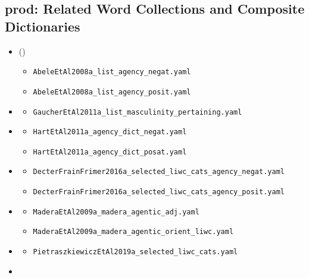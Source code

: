 \documentclass[a4paper,10pt,onecolumn,oneside,openright]{article}
\begin{document}
\subsection{prod: Related Word Collections and Composite Dictionaries}
\label{sec:orga2064ee}
\begin{itemize}
\item \textcite{AbeleEtAl2008a} (\cite{AbeleEtAl2008d})
\begin{itemize}
\item \texttt{AbeleEtAl2008a\_list\_agency\_negat.yaml}
\item \texttt{AbeleEtAl2008a\_list\_agency\_posit.yaml}
\end{itemize}
\item \textcite{GaucherEtAl2011a}
\begin{itemize}
\item \texttt{GaucherEtAl2011a\_list\_masculinity\_pertaining.yaml}
\end{itemize}
\item \textcite{HartEtAl2011a}
\begin{itemize}
\item \texttt{HartEtAl2011a\_agency\_dict\_negat.yaml}
\item \texttt{HartEtAl2011a\_agency\_dict\_posat.yaml}
\end{itemize}
\item \textcite{Decter-FrainFrimer2016a}
\begin{itemize}
\item \texttt{DecterFrainFrimer2016a\_selected\_liwc\_cats\_agency\_negat.yaml}
\item \texttt{DecterFrainFrimer2016a\_selected\_liwc\_cats\_agency\_posit.yaml}
\end{itemize}
\item \textcite{MaderaEtAl2009a}
\begin{itemize}
\item \texttt{MaderaEtAl2009a\_madera\_agentic\_adj.yaml}
\item \texttt{MaderaEtAl2009a\_madera\_agentic\_orient\_liwc.yaml}
\end{itemize}
\item \textcite{PietraszkiewiczEtAl2019a}
\begin{itemize}
\item \texttt{PietraszkiewiczEtAl2019a\_selected\_liwc\_cats.yaml}
\end{itemize}
\item \textcite{NicolasEtAl2021a}
\begin{itemize}

\end{itemize}
\end{itemize}
\end{document}
